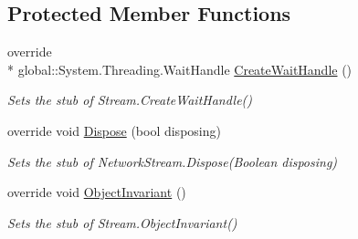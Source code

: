 \subsection*{Protected Member Functions}
\begin{DoxyCompactItemize}
\item 
override \\*
global\-::\-System.\-Threading.\-Wait\-Handle \hyperlink{class_system_1_1_net_1_1_sockets_1_1_fakes_1_1_stub_network_stream_a5f2ed881094c0ac0a788cdf8791f6478}{Create\-Wait\-Handle} ()
\begin{DoxyCompactList}\small\item\em Sets the stub of Stream.\-Create\-Wait\-Handle()\end{DoxyCompactList}\item 
override void \hyperlink{class_system_1_1_net_1_1_sockets_1_1_fakes_1_1_stub_network_stream_a978fe855dfcd7ac10b3ce761b477113f}{Dispose} (bool disposing)
\begin{DoxyCompactList}\small\item\em Sets the stub of Network\-Stream.\-Dispose(\-Boolean disposing)\end{DoxyCompactList}\item 
override void \hyperlink{class_system_1_1_net_1_1_sockets_1_1_fakes_1_1_stub_network_stream_ae985ffeb99d2157726fa6cc009a7f7db}{Object\-Invariant} ()
\begin{DoxyCompactList}\small\item\em Sets the stub of Stream.\-Object\-Invariant()\end{DoxyCompactList}\end{DoxyCompactItemize}
